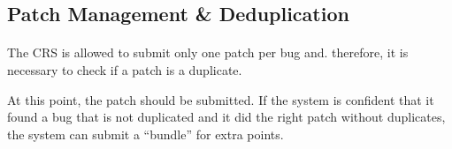 \subsection{Patch Management \& Deduplication}

\paragraph{\patcherg} 


The CRS is allowed to submit only one patch per bug and. therefore, it is necessary to check if a patch is a duplicate.

At this point, the patch should be submitted.
If the system is confident that it found a bug that is not duplicated and it did the right patch without duplicates, the system can submit a ``bundle'' for extra points.